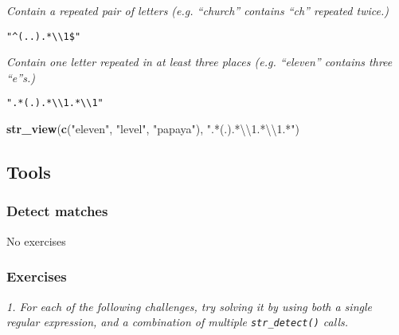 \documentclass[]{article}
\newenvironment{Shaded}{\begin{snugshade}}{\end{snugshade}}
\newcommand{\KeywordTok}[1]{\textcolor[rgb]{0.13,0.29,0.53}{\textbf{#1}}}
\newcommand{\CharTok}[1]{\textcolor[rgb]{0.31,0.60,0.02}{#1}}
\newcommand{\StringTok}[1]{\textcolor[rgb]{0.31,0.60,0.02}{#1}}
\newcommand{\NormalTok}[1]{#1}
\theoremstyle{definition}
\theoremstyle{definition}
\theoremstyle{definition}
\theoremstyle{remark}
\begin{document}
\emph{Contain a repeated pair of letters (e.g. ``church'' contains
``ch'' repeated twice.)}

\texttt{"\^{}(..).*\textbackslash{}\textbackslash{}1\$"}

\begin{Shaded}
\end{Shaded}

\hypertarget{htmlwidget-ef5cf0c5fa3c4441e3e1}{}

\emph{Contain one letter repeated in at least three places (e.g.
``eleven'' contains three ``e''s.)}

\texttt{".*(.).*\textbackslash{}\textbackslash{}1.*\textbackslash{}\textbackslash{}1"}

\begin{Shaded}
\begin{Highlighting}[]
\KeywordTok{str_view}\NormalTok{(}\KeywordTok{c}\NormalTok{(}\StringTok{"eleven"}\NormalTok{, }\StringTok{"level"}\NormalTok{, }\StringTok{"papaya"}\NormalTok{), }\StringTok{".*(.).*}\CharTok{\textbackslash{}\textbackslash{}}\StringTok{1.*}\CharTok{\textbackslash{}\textbackslash{}}\StringTok{1.*"}\NormalTok{)}
\end{Highlighting}
\end{Shaded}

\hypertarget{htmlwidget-d0b86c0fa541446dd311}{}

\subsection{Tools}\label{tools}

\subsubsection{Detect matches}\label{detect-matches}

No exercises

\subsubsection{Exercises}\label{exercises-31}

\emph{1. For each of the following challenges, try solving it by using
both a single regular expression, and a combination of multiple
\texttt{str\_detect()} calls.}
\end{document}
